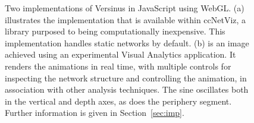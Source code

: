 \documentclass[runningheads]{llncs}
\begin{document}
\begin{figure}[!h]\centering
    \qquad
    \caption{Two implementations of Versinus in JavaScript using WebGL. (a) illustrates the implementation that is available within ccNetViz, a library purposed to being computationally inexpensive. This implementation handles static networks by default. (b) is an image achieved using an experimental Visual Analytics application.
    It renders the animations in real time, with multiple controls for inspecting the network structure and controlling the animation, in association with other analysis techniques. The sine oscillates both in the vertical and depth axes, as does the periphery segment. Further information is given in Section~\ref{sec:imp}.}
    \label{fig:extra}
\end{figure}
\end{document}
